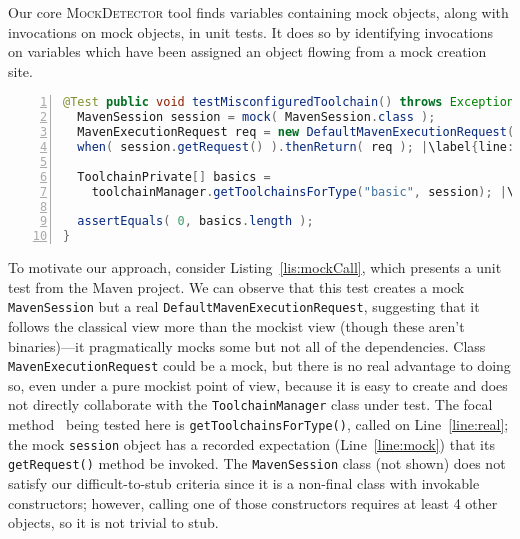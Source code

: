 \label{sec:motivating-example}

Our core \textsc{MockDetector} tool finds variables containing mock objects, along with invocations on mock objects, in unit tests. It does so by identifying invocations on variables which have been assigned an object flowing from a mock creation site.

\begin{lstlisting}[basicstyle=\ttfamily, caption={Code snippet from maven-core, where calls to both the focal method \texttt{getToolchainsForType()} and to mock \texttt{session}'s \texttt{getRequest()} method occur in test \textit{testMisconfiguredToolchain()}.},
numbers=left,numbersep=2pt,basicstyle=\scriptsize\ttfamily,language = Java, framesep=4.5mm, escapechar=|,
framexleftmargin=1.0mm, captionpos=b, label=lis:mockCall, morekeywords={@Test}]
@Test public void testMisconfiguredToolchain() throws Exception {
  MavenSession session = mock( MavenSession.class );
  MavenExecutionRequest req = new DefaultMavenExecutionRequest();
  when( session.getRequest() ).thenReturn( req ); |\label{line:mock}|

  ToolchainPrivate[] basics =
    toolchainManager.getToolchainsForType("basic", session); |\label{line:real}|

  assertEquals( 0, basics.length );
}
\end{lstlisting}

To motivate our approach, consider Listing~\ref{lis:mockCall}, which presents a unit test from the Maven project. We can observe that this test creates a mock \texttt{MavenSession} but a real \texttt{DefaultMavenExecutionRequest}, suggesting that it follows the classical view more than the mockist view (though these aren't binaries)---it pragmatically mocks some but not all of the dependencies. Class \texttt{MavenExecutionRequest} could be a mock, but there is no real advantage to doing so, even under a pure mockist point of view, because it is easy to create and does not directly collaborate with the \texttt{ToolchainManager} class under test. The focal method~\cite{ghafari15:_autom} being tested here is \texttt{getToolchainsForType()}, called on Line~\ref{line:real}; the mock \texttt{session} object has a recorded expectation (Line~\ref{line:mock}) that its \texttt{getRequest()} method be invoked. The \texttt{MavenSession} class (not shown) does not satisfy our difficult-to-stub criteria since it is a non-final class with invokable constructors; however, calling one of those constructors requires at least 4 other objects, so it is not trivial to stub.

